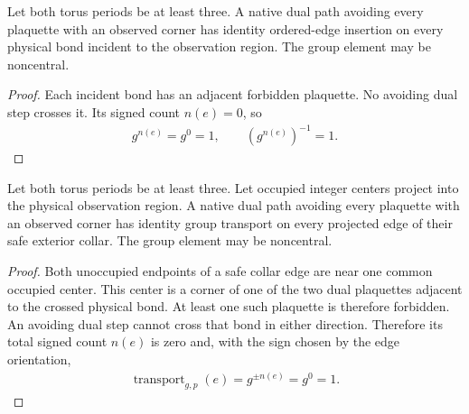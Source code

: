 \begin{lemma}
    \label{lem:peps_flux_avoiding_incident_identity}
    \leanok
    Let both torus periods be at least three. A native dual path avoiding every plaquette with an observed corner
    has identity ordered-edge insertion on every physical bond incident
    to the observation region. The group element may be noncentral.
\end{lemma}
\begin{proof}\leanok
    Each incident bond has an adjacent forbidden plaquette. No avoiding
    dual step crosses it. Its signed count $n(e)=0$, so
    \begin{align}
        g^{n(e)}=g^0=1,\qquad (g^{n(e)})^{-1}=1.
        \label{eq:peps_avoiding_incident_power}
    \end{align}
\end{proof}

\begin{lemma}
    \label{lem:peps_flux_safe_collar_untwisted}
    \leanok
    Let both torus periods be at least three. Let occupied integer centers project into the physical observation
    region. A native dual path avoiding every plaquette with an observed
    corner has identity group transport on every projected edge of their
    safe exterior collar. The group element may be noncentral.
\end{lemma}
\begin{proof}\leanok
    Both unoccupied endpoints of a safe collar edge are near one common
    occupied center. This center is a corner of one of the two dual
    plaquettes adjacent to the crossed physical bond. At least one such
    plaquette is therefore forbidden. An avoiding dual step cannot cross
    that bond in either direction. Therefore its total signed count $n(e)$
    is zero and, with the sign chosen by the edge orientation,
    \begin{align}
        \operatorname{transport}_{g,p}(e)=g^{\pm n(e)}=g^0=1.
        \label{eq:peps_safe_collar_transport}
    \end{align}
\end{proof}

